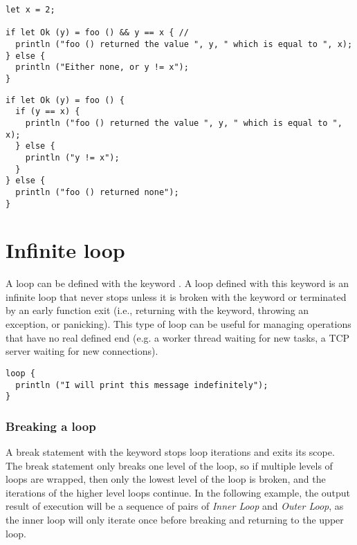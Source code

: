 \begin{lstlisting}[style=coloredverbatim, caption=Using a pattern guard]
let x = 2;

if let Ok (y) = foo () && y == x { //
  println ("foo () returned the value ", y, " which is equal to ", x);
} else {
  println ("Either none, or y != x");
}
\end{lstlisting}

\begin{lstlisting}[style=coloredverbatim, caption=Using a second condition instead of pattern guard, label=lst:using_second_cond_no_guard]
if let Ok (y) = foo () {
  if (y == x) {
    println ("foo () returned the value ", y, " which is equal to ", x);
  } else {
    println ("y != x");
  }
} else {
  println ("foo () returned none");
}
\end{lstlisting}

\section{Infinite loop}%
\label{sec:inf_loop}

A loop can be defined with the keyword . A loop defined with this
keyword is an infinite loop that never stops unless it is broken with the
 keyword or terminated by an early function exit (i.e., returning
with the  keyword, throwing an exception, or panicking). This type
of loop can be useful for managing operations that have no real defined end
(e.g. a worker thread waiting for new tasks, a TCP server waiting for new
connections).

\begin{lstlisting}[style=coloredverbatim]
loop {
  println ("I will print this message indefinitely");
}
\end{lstlisting}

\subsubsection{Breaking a loop}
\label{sec:breaking_loops}

A break statement with the keyword  stops loop iterations and exits
its scope. The break statement only breaks one level of the loop, so if multiple
levels of loops are wrapped, then only the lowest level of the loop is broken,
and the iterations of the higher level loops continue. In the following example,
the output result of execution will be a sequence of pairs of \textit{Inner
  Loop} and \textit{Outer Loop}, as the inner loop will only iterate once before
breaking and returning to the upper loop.


